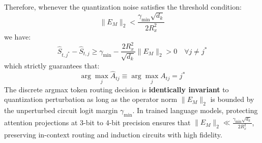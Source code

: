 \documentclass[10pt,twocolumn,letterpaper]{article}
\begin{document}
Therefore, whenever the quantization noise satisfies the threshold condition:
\begin{equation}
    \|E_M\|_2 < \frac{\gamma_{\min} \sqrt{d_k}}{2 R_x^2}
\end{equation}
we have:
\begin{equation}
    \widehat{S}_{t, j^*} - \widehat{S}_{t, j} \ge \gamma_{\min} - \frac{2 R_x^2}{\sqrt{d_k}} \|E_M\|_2 > 0 \quad \forall j \ne j^*
\end{equation}
which strictly guarantees that:
\begin{equation}
    \arg\max_j \widehat{A}_{tj} \equiv \arg\max_j A_{tj} = j^*
\end{equation}
The discrete argmax token routing decision is \textbf{identically invariant} to quantization perturbation as long as the operator norm $\|E_M\|_2$ is bounded by the unperturbed circuit logit margin $\gamma_{\min}$. In trained language models, protecting attention projections at 3-bit to 4-bit precision ensures that $\|E_M\|_2 \ll \frac{\gamma_{\min} \sqrt{d_k}}{2 R_x^2}$, preserving in-context routing and induction circuits with high fidelity.
\end{document}
